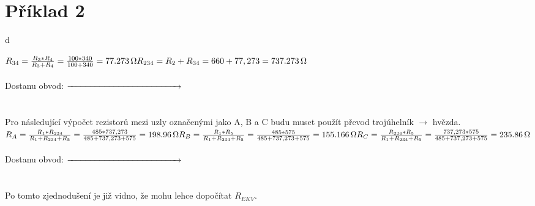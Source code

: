 \section{Příklad 2}



\begin{multicols}{2}
\let\clearpage\relax

\noindent d

\noindent $R_{34} = \frac{R_3*R_4}{R_3+R_4} = \frac{100*340}{100+340} = \SI{77,273}{\ohm} \\
R_{234} = R_2+R_{34} = 660+77,273 = \SI{737,273}{\ohm}$ \\ \\
Dostanu obvod: \hspace*{0.5cm} \vspace*{-0.82cm} $\xrightarrow{\hspace*{4.5cm}}$ \\
\vspace*{0.4cm} \\ \\
Pro následující výpočet rezistorů mezi uzly označenými jako A, B a C budu muset použít převod trojúhelník $\rightarrow$ hvězda. \\
$R_{A} = \frac{R_1*R_{234}}{R_1+R_{234}+R_5} = \frac{485*737,273}{485+737,273+575} = \SI{198,96}{\ohm}\\
R_{B} = \frac{R_1*R_5}{R_1+R_{234}+R_5} = \frac{485*575}{485+737,273+575} = \SI{155,166}{\ohm}\\
R_{C} = \frac{R_{234}*R_5}{R_1+R_{234}+R_5} = \frac{737,273*575}{485+737,273+575} = \SI{235,86}{\ohm}$ \\ \\
Dostanu obvod: \hspace*{0.5cm} \vspace*{-0.82cm} $\xrightarrow{\hspace*{4.5cm}}$ \\
\vspace*{0.4cm} \\ \\
Po tomto zjednodušení je již vidno, že mohu lehce dopočítat $R_{EKV}$.

\centering
\columnbreak

\vspace*{-0.9cm}


\end{multicols}
